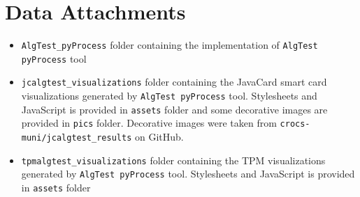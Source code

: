 \chapter{Data Attachments}
\begin{itemize}
    \item \texttt{AlgTest\_pyProcess} folder containing the implementation of \texttt{AlgTest pyProcess} tool
    \item \texttt{jcalgtest\_visualizations} folder containing the JavaCard smart card visualizations generated by \texttt{AlgTest pyProcess} tool. Stylesheets and JavaScript is provided in \texttt{assets} folder and some decorative images are provided in \texttt{pics} folder. Decorative images were taken from \texttt{crocs-muni/jcalgtest\_results} on GitHub.
    
    \item \texttt{tpmalgtest\_visualizations} folder containing the TPM visualizations generated by \texttt{AlgTest pyProcess} tool. Stylesheets and JavaScript is provided in \texttt{assets} folder 
\end{itemize}
